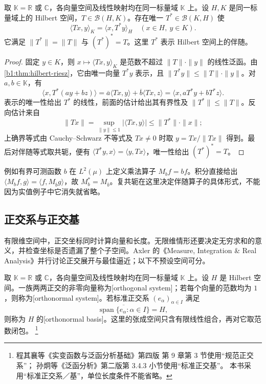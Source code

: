 \begin{proposition}\label{b1:prop:hilbert-adjoint}
取 \(\mathbb K=\mathbb R\) 或 \(\mathbb C\)，各向量空间及线性映射均在同一标量域 \(\mathbb K\) 上。设 \(H,K\) 是同一标量域上的 Hilbert 空间，\(T\in\mathcal B(H,K)\)。存在唯一 \(T^*\in\mathcal B(K,H)\) 使
\[
\langle Tx,y\rangle_K=\langle x,T^*y\rangle_H
\quad(x\in H,\ y\in K).
\]
它满足 \(\|T^*\|=\|T\|\) 与 \((T^*)^*=T\)。这里 \(T^*\) 表示 Hilbert 空间上的伴随。
\end{proposition}
\begin{proof}
固定 \(y\in K\)，则 \(x\mapsto\langle Tx,y\rangle_K\) 是范数不超过 \(\|T\|\cdot\|y\|\) 的线性泛函。由\cref{b1:thm:hilbert-riesz}，它由唯一向量 \(T^*y\) 表示，且 \(\|T^*y\|\leq\|T\|\cdot\|y\|\)。对 \(a,b\in\mathbb K\)，有
\[
\langle x,T^*(ay+bz)\rangle
=\overline a\langle Tx,y\rangle+\overline b\langle Tx,z\rangle
=\langle x,aT^*y+bT^*z\rangle.
\]
表示的唯一性给出 \(T^*\) 的线性，前面的估计给出其有界性及 \(\|T^*\|\leq\|T\|\)。反向估计来自
\[
\|Tx\|=\sup_{\|y\|\leq1}|\langle Tx,y\rangle|
\leq\|T^*\|\cdot\|x\|;
\]
上确界等式由 Cauchy--Schwarz 不等式及 \(Tx\ne0\) 时取 \(y=Tx/\|Tx\|\) 得到。最后对伴随等式取共轭，便有 \(\langle T^*y,x\rangle=\langle y,Tx\rangle\)，唯一性给出 \((T^*)^*=T\)。
\end{proof}

例如有界可测函数 \(b\) 在 \(L^2(\mu)\) 上定义乘法算子 \(M_bf=bf\)。积分直接给出 \(\langle M_bf,g\rangle=\langle f,M_{\overline b}g\rangle\)，故 \(M_b^*=M_{\overline b}\)。复共轭在这里决定伴随算子的具体形式，不能因为实值例子中它消失就省略。

\subsection{正交系与正交基}
\label{b1:subsec:080404}

有限维空间中，正交坐标同时计算向量和长度。无限维情形还要决定无穷求和的意义，并检查坐标是否遗漏了整个子空间。Axler 的《Measure, Integration \& Real Analysis》\cite[Section 8C]{Axler2020Measure}并行讨论正交展开与最佳逼近；以下不预设空间可分。

\begin{definition}\label{b1:def:orthonormal-system}
取 \(\mathbb K=\mathbb R\) 或 \(\mathbb C\)，各向量空间及线性映射均在同一标量域 \(\mathbb K\) 上。设 \(H\) 是 Hilbert 空间。一族两两正交的非零向量称为[orthogonal system]；若每个向量的范数均为 \(1\)，则称为[orthonormal system]。若标准正交系 \((e_\alpha)_{\alpha\in I}\) 满足
\[
\overline{\operatorname{span}\{e_\alpha:\alpha\in I\}}=H,
\]
则称为 \(H\) 的[orthonormal basis]。这里的张成空间只含有限线性组合，再对它取范数闭包。%
\footnote{程其襄等《实变函数与泛函分析基础》第四版\cite{Cheng2019ShibianFanhan}%
第 9 章第 3 节使用“规范正交系”；
孙炯等《泛函分析》第二版\cite{Sun2018Fanhan}第 3.4.3 小节使用“标准正交基”。
本书采用“标准正交系／基”，单位长度条件不能省略。}
\end{definition}

